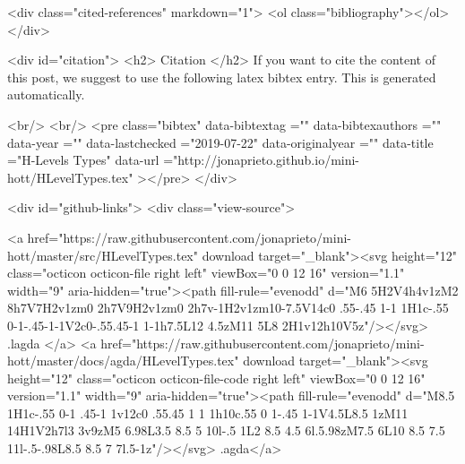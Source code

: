   <div class="cited-references" markdown="1">
  <ol class="bibliography"></ol>
  </div>


  
  <div id="citation">
  <h2> Citation </h2>
  If you want to cite the content of this post,
  we suggest to use the following latex bibtex entry.
  This is generated automatically.

  <br/>
  <br/>
  <pre class="bibtex"
       data-bibtextag =""
       data-bibtexauthors =""
       data-year =""
       data-lastchecked ="2019-07-22"
       data-originalyear =""
       data-title ="H-Levels Types"
       data-url ="http://jonaprieto.github.io/mini-hott/HLevelTypes.tex"
  ></pre>
  </div>
  

  <div id="github-links">
    <div class="view-source">
      
        <a href="https://raw.githubusercontent.com/jonaprieto/mini-hott/master/src/HLevelTypes.tex" download target="_blank"><svg height="12" class="octicon octicon-file right left" viewBox="0 0 12 16" version="1.1" width="9" aria-hidden="true"><path fill-rule="evenodd" d="M6 5H2V4h4v1zM2 8h7V7H2v1zm0 2h7V9H2v1zm0 2h7v-1H2v1zm10-7.5V14c0 .55-.45 1-1 1H1c-.55 0-1-.45-1-1V2c0-.55.45-1 1-1h7.5L12 4.5zM11 5L8 2H1v12h10V5z"/></svg> .lagda </a>
        <a href="https://raw.githubusercontent.com/jonaprieto/mini-hott/master/docs/agda/HLevelTypes.tex" download target="_blank"><svg height="12" class="octicon octicon-file-code right left" viewBox="0 0 12 16" version="1.1" width="9" aria-hidden="true"><path fill-rule="evenodd" d="M8.5 1H1c-.55 0-1 .45-1 1v12c0 .55.45 1 1 1h10c.55 0 1-.45 1-1V4.5L8.5 1zM11 14H1V2h7l3 3v9zM5 6.98L3.5 8.5 5 10l-.5 1L2 8.5 4.5 6l.5.98zM7.5 6L10 8.5 7.5 11l-.5-.98L8.5 8.5 7 7l.5-1z"/></svg> .agda</a>
      
